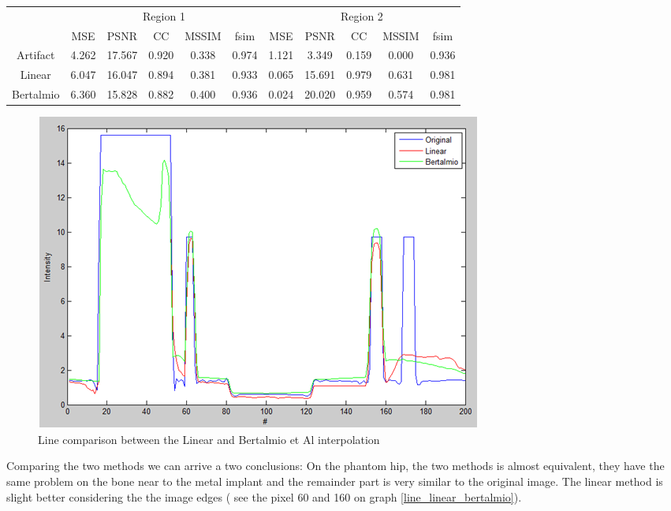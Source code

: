 \begin{adjustwidth}{-1in}{-1in}
\centering
\begin{tabular}{c|c|c|c|c|c|c|c|c|c|c|}
\cline{2-11}
& \multicolumn{5}{|c|}{Region 1} & \multicolumn{5}{|c|}{Region 2} \\
\cline{2-11}
& MSE & PSNR & CC & MSSIM & fsim  & MSE & PSNR & CC & MSSIM & fsim  \\
\hline
\multicolumn{1}{|c|}{Artifact} & 4.262	& 17.567 &0.920	&0.338	&0.974	&1.121	&3.349	&0.159	&0.000	&0.936 \\
\multicolumn{1}{|c|}{Linear} &6.047	&16.047	&0.894	&0.381	&0.933	&0.065	&15.691	&0.979	&0.631	&0.981 \\
\multicolumn{1}{|c|}{Bertalmio} & 6.360	&15.828	&0.882	&0.400	&0.936	&0.024	&20.020	&0.959	&0.574	&0.981 \\
\hline
\end{tabular}
\end{adjustwidth}
\medskip

\begin{figure}[H]
\centering
\includegraphics[scale=0.7]{img/line_linear_bertalmio}
\caption{{Line comparison between the Linear and Bertalmio et Al interpolation}}\label{line_linear_bertalmio}
\end{figure}

Comparing the two methods we can arrive a two conclusions: On the phantom hip, the two methods is almost equivalent, they have the same problem on the bone near to the metal implant and the remainder part is very similar to the original image. The linear method is slight better considering the the image edges ( see the pixel 60 and 160 on graph \eqref{line_linear_bertalmio}).

